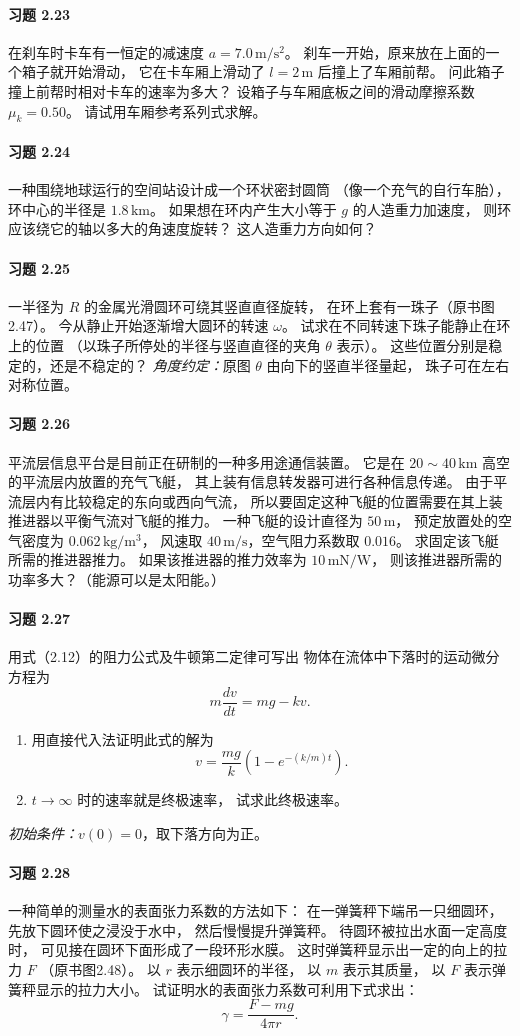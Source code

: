 \paragraph{习题 2.23}
在刹车时卡车有一恒定的减速度
\(a=7.0\,\mathrm{m/s^2}\)。
刹车一开始，原来放在上面的一个箱子就开始滑动，
它在卡车厢上滑动了 \(l=2\,\mathrm m\) 后撞上了车厢前帮。
问此箱子撞上前帮时相对卡车的速率为多大？
设箱子与车厢底板之间的滑动摩擦系数
\(\mu_k=0.50\)。
请试用车厢参考系列式求解。

\paragraph{习题 2.24}
一种围绕地球运行的空间站设计成一个环状密封圆筒
（像一个充气的自行车胎），环中心的半径是
\(1.8\,\mathrm{km}\)。
如果想在环内产生大小等于 \(g\) 的人造重力加速度，
则环应该绕它的轴以多大的角速度旋转？
这人造重力方向如何？

\paragraph{习题 2.25}
一半径为 \(R\) 的金属光滑圆环可绕其竖直直径旋转，
在环上套有一珠子（原书图2.47）。
今从静止开始逐渐增大圆环的转速 \(\omega\)。
试求在不同转速下珠子能静止在环上的位置
（以珠子所停处的半径与竖直直径的夹角 \(\theta\) 表示）。
这些位置分别是稳定的，还是不稳定的？
\textit{角度约定：}原图 \(\theta\) 由向下的竖直半径量起，
珠子可在左右对称位置。

\paragraph{习题 2.26}
平流层信息平台是目前正在研制的一种多用途通信装置。
它是在 \(20\sim40\,\mathrm{km}\) 高空的平流层内放置的充气飞艇，
其上装有信息转发器可进行各种信息传递。
由于平流层内有比较稳定的东向或西向气流，
所以要固定这种飞艇的位置需要在其上装推进器以平衡气流对飞艇的推力。
一种飞艇的设计直径为 \(50\,\mathrm m\)，
预定放置处的空气密度为 \(0.062\,\mathrm{kg/m^3}\)，
风速取 \(40\,\mathrm{m/s}\)，空气阻力系数取 \(0.016\)。
求固定该飞艇所需的推进器推力。
如果该推进器的推力效率为 \(10\,\mathrm{mN/W}\)，
则该推进器所需的功率多大？（能源可以是太阳能。）

\paragraph{习题 2.27}
用式（2.12）的阻力公式及牛顿第二定律可写出
物体在流体中下落时的运动微分方程为
\[
 m\frac{dv}{dt}=mg-kv.
\]
\begin{enumerate}
\item 用直接代入法证明此式的解为
\[
 v=\frac{mg}{k}\left(1-e^{-(k/m)t}\right).
\]
\item \(t\to\infty\) 时的速率就是终极速率，
试求此终极速率。
\end{enumerate}
\textit{初始条件：}\(v(0)=0\)，取下落方向为正。

\paragraph{习题 2.28}
一种简单的测量水的表面张力系数的方法如下：
在一弹簧秤下端吊一只细圆环，
先放下圆环使之浸没于水中，
然后慢慢提升弹簧秤。
待圆环被拉出水面一定高度时，
可见接在圆环下面形成了一段环形水膜。
这时弹簧秤显示出一定的向上的拉力 \(F\)
（原书图2.48）。
以 \(r\) 表示细圆环的半径，
以 \(m\) 表示其质量，
以 \(F\) 表示弹簧秤显示的拉力大小。
试证明水的表面张力系数可利用下式求出：
\[
 \gamma=\frac{F-mg}{4\pi r}.
\]
